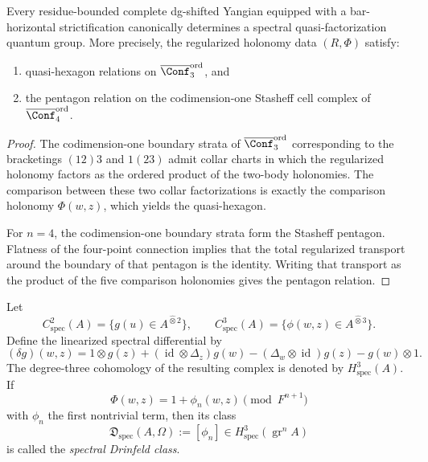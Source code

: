 \begin{theorem}
\ClaimStatusProvedHere
\label{thm:quasi-factorization}
Every residue-bounded complete dg-shifted Yangian equipped with a
bar-horizontal strictification canonically determines a spectral
quasi-factorization quantum group.
More precisely, the regularized holonomy data $(R,\Phi)$ satisfy:
\begin{enumerate}
\item quasi-hexagon relations on $\overline{\Conf}_3^{\mathrm{ord}}$, and
\item the pentagon relation on the codimension-one Stasheff cell complex
  of $\overline{\Conf}_4^{\mathrm{ord}}$.
\end{enumerate}
\end{theorem}

\begin{proof}
The codimension-one boundary strata of
$\overline{\Conf}_3^{\mathrm{ord}}$ corresponding to the bracketings
$(12)3$ and $1(23)$ admit collar charts in which the regularized
holonomy factors as the ordered product of the two-body holonomies.
The comparison between these two collar factorizations is exactly the
comparison holonomy $\Phi(w,z)$, which yields the quasi-hexagon.

For $n=4$, the codimension-one boundary strata form the Stasheff
pentagon.  Flatness of the four-point connection implies that the total
regularized transport around the boundary of that pentagon is the
identity.  Writing that transport as the product of the five comparison
holonomies gives the pentagon relation.
\end{proof}

\begin{definition}
Let
\[
C^2_{\mathrm{spec}}(A)=\{g(u)\in A^{\widehat\otimes 2}\},
\qquad
C^3_{\mathrm{spec}}(A)=\{\phi(w,z)\in A^{\widehat\otimes 3}\}.
\]
Define the linearized spectral differential by
\[
(\delta g)(w,z)
=
1\otimes g(z)
+ (\operatorname{id}\otimes \Delta_z)g(w)
- (\Delta_w\otimes \operatorname{id})g(z)
- g(w)\otimes 1.
\]
The degree-three cohomology of the resulting complex is denoted by
$H^3_{\mathrm{spec}}(A)$.
If
\[
\Phi(w,z)=1+\phi_n(w,z)\pmod{F^{n+1}}
\]
with $\phi_n$ the first nontrivial term, then its class
\[
\mathfrak D_{\mathrm{spec}}(A,\Omega):=[\phi_n]
\in H^3_{\mathrm{spec}}(\operatorname{gr}^n A)
\]
is called the \emph{spectral Drinfeld class}.
\end{definition}

